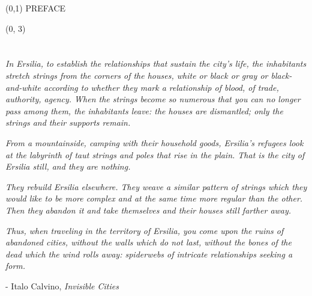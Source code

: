 \documentclass[10pt]{article}
\begin{document}
\begin{textblock}{23}(0,1)
\center\huge PREFACE
\end{textblock}

\begin{textblock}{11}(0, 3)

\section{}

\textit{In Ersilia, to establish the relationships that sustain the city's
life, the inhabitants stretch strings from the corners of the houses, white or
black or gray or black-and-white according to whether they mark a relationship
of blood, of trade, authority, agency. When the strings become so numerous that
you can no longer pass among them, the inhabitants leave: the houses are
dismantled; only the strings and their supports remain.}

\textit{From a mountainside, camping with their household goods, Ersilia's
refugees look at the labyrinth of taut strings and poles that rise in the
plain. That is the city of Ersilia still, and they are nothing.}

\textit{They rebuild Ersilia elsewhere. They weave a similar pattern of strings
which they would like to be more complex and at the same time more regular than
the other. Then they abandon it and take themselves and their houses still
farther away.}

\textit{Thus, when traveling in the territory of Ersilia, you come upon the
ruins of abandoned cities, without the walls which do not last, without the
bones of the dead which the wind rolls away: spiderwebs of intricate
relationships seeking a form.}

- Italo Calvino, \emph{Invisible Cities}

\end{textblock}
\end{document}
